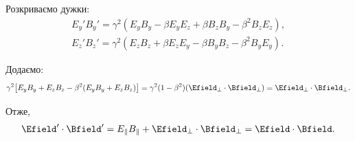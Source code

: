 \begin{problem}
\begin{itemize}
              Розкриваємо дужки:
              \begin{equation*}
                  \begin{aligned}
                      E_y' B_y' = \gamma^2 \left( E_y B_y - \beta E_y E_z + \beta B_z B_y - \beta^2 B_z E_z \right), \\
                      E_z' B_z' = \gamma^2 \left( E_z B_z + \beta E_z E_y - \beta B_y B_z - \beta^2 B_y E_y \right).
                  \end{aligned}
              \end{equation*}

              Додаємо:
              \begin{equation*}
                  \gamma^2 \bigl[ E_y B_y + E_z B_z - \beta^2 (E_y B_y + E_z B_z) \bigr] = \gamma^2 (1 - \beta^2) (\Efield_\perp \cdot \Bfield_\perp) = \Efield_\perp \cdot \Bfield_\perp.
              \end{equation*}

              Отже,
              \begin{equation*}
                  \Efield' \cdot \Bfield' = E_\parallel B_\parallel + \Efield_\perp \cdot \Bfield_\perp = \Efield \cdot \Bfield.
              \end{equation*}

    \end{itemize}

%

\end{problem}



